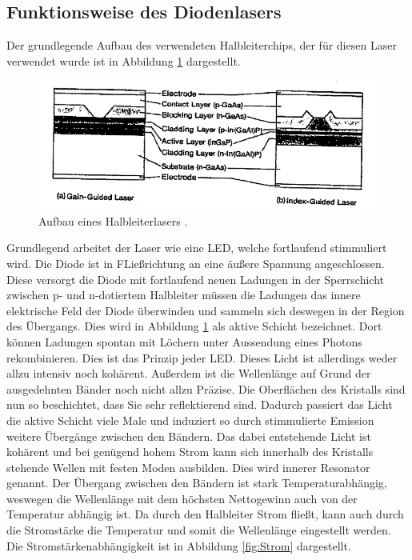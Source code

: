 \subsection{Funktionsweise des Diodenlasers}
Der grundlegende Aufbau des verwendeten Halbleiterchips, der für diesen Laser verwendet wurde ist in Abbildung \ref{fig:Chip} dargestellt.
\begin{figure}[H]
    \centering
    \includegraphics[scale=0.8]{pictures/Chip.png}
    \caption{Aufbau eines Halbleiterlasers \cite{teachspin}.}
    \label{fig:Chip}
\end{figure}
\noindent Grundlegend arbeitet der Laser wie eine LED, welche fortlaufend stimmuliert wird. Die Diode ist in FLießrichtung 
an eine äußere Spannung angeschlossen. Diese versorgt die Diode mit fortlaufend neuen Ladungen in der Sperrschicht 
zwischen p- und n-dotiertem Halbleiter müssen die Ladungen das innere elektrische Feld der Diode überwinden und sammeln sich deswegen in der Region des Übergangs.
Dies wird in Abbildung  \ref{fig:Chip} als aktive Schicht bezeichnet. Dort können Ladungen spontan mit Löchern unter Aussendung eines Photons rekombinieren.
Dies ist das Prinzip jeder LED. Dieses Licht ist allerdings weder allzu intensiv noch kohärent. Außerdem ist die Wellenlänge auf Grund der ausgedehnten Bänder 
noch nicht allzu Präzise. Die Oberflächen des Kristalls sind nun so beschichtet, dass Sie sehr reflektierend sind. Dadurch passiert das Licht die aktive Schicht viele 
Male und induziert so durch stimmulierte Emission weitere Übergänge zwischen den Bändern. Das dabei entstehende Licht ist kohärent und bei genügend hohem Strom kann sich 
innerhalb des Kristalls stehende Wellen mit festen Moden ausbilden. Dies wird innerer Resonator genannt.
Der Übergang zwischen den Bändern ist stark Temperaturabhängig, weswegen die Wellenlänge mit dem höchsten Nettogewinn auch von der Temperatur abhängig ist.
Da durch den Halbleiter Strom fließt, kann auch durch die Stromstärke die Temperatur und somit die Wellenlänge eingestellt werden. 
Die Stromstärkenabhängigkeit ist in Abbildung \ref{fig:Strom} dargestellt.

